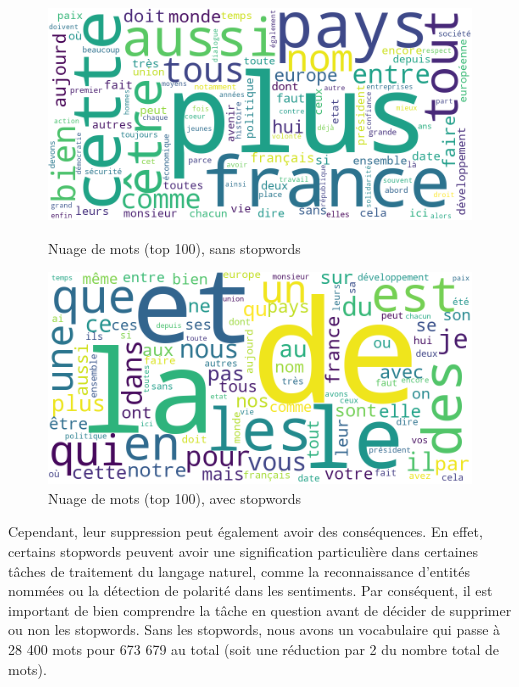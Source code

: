 \documentclass{article}
\begin{document}
\begin{figure}[H]
    \centering
    \begin{minipage}[b]{0.45\textwidth}
        \centering
        \includegraphics[width=\textwidth]{./src/locuteur/wordcloud_stopwords.png}
        \caption{Nuage de mots (top 100), sans stopwords}
        \label{wordcloud_stopwords_pres}
    \end{minipage}
    \hfill
    \begin{minipage}[b]{0.45\textwidth}
        \centering
        \includegraphics[width=\textwidth]{./src/locuteur/wordcloud_nostopwords.png}
        \caption{Nuage de mots (top 100), avec stopwords}
        \label{wordcloud_nostopwords_pres}
    \end{minipage}
\end{figure}

Cependant, leur suppression peut également avoir des conséquences. En effet, certains stopwords peuvent avoir une signification particulière dans certaines tâches de traitement du langage naturel, comme la reconnaissance d'entités nommées ou la détection de polarité dans les sentiments. Par conséquent, il est important de bien comprendre la tâche en question avant de décider de supprimer ou non les stopwords. Sans les stopwords, nous avons un vocabulaire qui passe à 28 400 mots pour 673 679 au total (soit une réduction par 2 du nombre total de mots).
\end{document}
